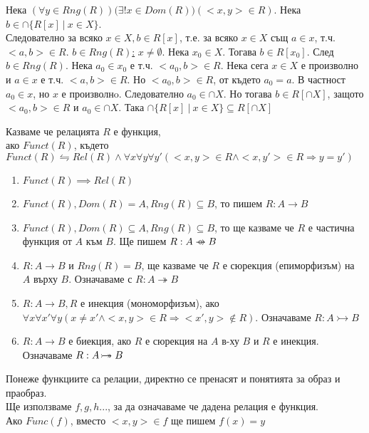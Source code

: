 \documentclass[fleqn, titlepage, 12pt]{report}
\newcommand*\rightbijectionarrow{\mathrel{\ooalign{
  $\twoheadrightarrow$\cr\hidewidth\hbox{$\rightarrowtail\mkern 1mu$}\cr }}}
\newcommand*\rightcircarrow{\mathrel{\ooalign{$\rightarrow$\cr\hidewidth\hbox{$\circ\mkern 5mu$}\cr}}}
\begin{document}
\bigbreak
Нека $(\forall{y \in Rng(R)})(\exists{!x \in Dom(R))(<x,y> \in R)}$. Нека $b \in \cap \{R[x]\ |\ x \in X\}$.\\
Следователно за всяко $x \in X, b \in R[x]$, т.е. за всяко $x \in X$ същ $a \in x$,
т.ч. $<a,b> \in R$.
\bigbreak
\underline{$b \in Rng(R)$:} $x \neq \emptyset$. Нека $x_0 \in X$. Тогава $b \in R[x_0]$. След $b \in Rng(R)$.
Нека $a_0 \in x_0$ е т.ч. $<a_0,b> \in R$. Нека сега $x \in X$ е произволно и $a \in x$ е т.ч. $<a,b> \in R$.
Но $<a_0,b> \in R$, от където $a_0 = a$. В частност $a_0 \in x$, но $x$ е произволнo. Следователно $a_0 \in \cap X$.
Но тогава $b \in R[\cap X]$, защото $<a_0,b> \in R$ и $a_0 \in \cap X$.
Така $\cap \{R[x]\ |\ x \in X\} \subseteq R[\cap X]$
\clearpage

\begin{center}
\end{center}

\bigbreak
{} Казваме че релацията $R$ е функция, \\
ако $Funct(R)$, където $Funct(R) \leftrightharpoons Rel(R) \land  \forall{x}\forall{y}\forall{y'}(<x,y> \in R \land  <x,y'> \in R \Rightarrow y = y')$
\bigbreak

\begin{enumerate}
  \item $Funct(R) \implies Rel(R)$
  \item $Funct(R), Dom(R) = A, Rng(R) \subseteq B$, то пишем $R: A \rightarrow B$
  \item $Funct(R), Dom(R) \subseteq A , Rng (R) \subseteq B$, то ще казваме че $R$ е частична функция от $A$ към $B$.
    Ще пишем $R: A \rightcircarrow B$
  \item $R: A \rightarrow B$ и $Rng(R) = B$, ще казваме че $R$ е сюрекция (епиморфизъм) на $A$ върху $B$.
    Означаваме с $R: A \twoheadrightarrow B$
  \item $R: A \rightarrow B, R$ е инекция (мономорфизъм),
    ако $\forall{x}\forall{x'}\forall{y}(x \neq x' \land <x,y> \in R \Rightarrow <x',y> \notin R)$.
    Означаваме $R: A \rightarrowtail B$
  \item $R: A \rightarrow B$ е биекция, ако $R$ е сюрекция на $A$ в-ху $B$ и $R$ е инекция.\\
    Означаваме $R: A \rightbijectionarrow B$
\end{enumerate}
\bigbreak

Понеже функциите са релации, директно се пренасят и понятията за образ и праобраз.\\
Ще използваме $f,g,h ...$, за да означаваме че дадена релация е функция.\\
Ако $Func(f)$, вместо $<x,y> \in f$ ще пишем $f(x) = y$
\bigbreak
\end{document}
